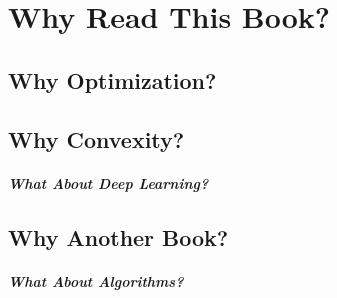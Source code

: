 \chapter{Why Read This Book?}
\label{chap:why_this_book}

\section{Why Optimization?}


\section{Why Convexity?}


\paragraph{What About Deep Learning?}

\section{Why Another Book?}

\paragraph{What About Algorithms?}

